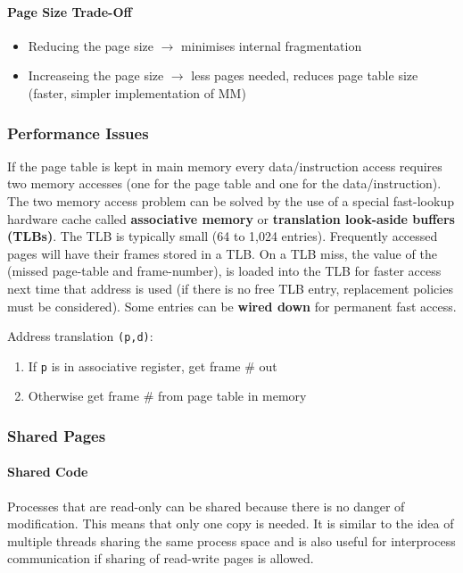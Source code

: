 \documentclass{article}%
\begin{document}
\paragraph{Page Size Trade-Off}
\label{sec:org4708429}
\begin{itemize}
\item Reducing the page size \(\rightarrow\) minimises internal fragmentation
\item Increaseing the page size \(\rightarrow\) less pages needed, reduces page table size (faster, simpler implementation of MM)
\end{itemize}
\subsubsection{Performance Issues}
\label{sec:org893b5ec}
If the page table is kept in main memory every data/instruction access requires two memory accesses (one for the page table and one for the data/instruction).
The two memory access problem can be solved by the use of a special fast-lookup hardware cache called \textbf{associative memory} or \textbf{translation look-aside buffers (TLBs)}.
The TLB is typically small (64 to 1,024 entries).
Frequently accessed pages will have their frames stored in a TLB.
On a TLB miss, the value of the (missed page-table and frame-number), is loaded into the TLB for faster access next time that address is used (if there is no free TLB entry, replacement policies must be considered).
Some entries can be \textbf{wired down} for permanent fast access.

Address translation \texttt{(p,d)}:
\begin{enumerate}
\item If \texttt{p} is in associative register, get frame \# out
\item Otherwise get frame \# from page table in memory
\end{enumerate}
\subsubsection{Shared Pages}
\label{sec:org078b0a6}
\paragraph{Shared Code}
\label{sec:org950e62b}
Processes that are read-only can be shared because there is no danger of modification.
This means that only one copy is needed.
It is similar to the idea of multiple threads sharing the same process space and is also useful for interprocess communication if sharing of read-write pages is allowed.
\end{document}
